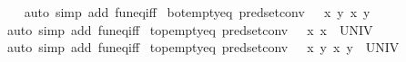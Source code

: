 \begin{isabellebody}
%
\isadelimproof
\ \ %
\endisadelimproof
%
\isatagproof
{}\isamarkupfalse%
\ {\isacharparenleft}{\kern0pt}auto\ simp\ add{\isacharcolon}{\kern0pt}\ fun{\isacharunderscore}{\kern0pt}eq{\isacharunderscore}{\kern0pt}iff{\isacharparenright}{\kern0pt}%
\endisatagproof
{\isafoldproof}%
%
\isadelimproof
\isanewline
%
\endisadelimproof
\isanewline
{}\isamarkupfalse%
\ bot{\isacharunderscore}{\kern0pt}empty{\isacharunderscore}{\kern0pt}eq{}\ {\isacharbrackleft}{\kern0pt}pred{\isacharunderscore}{\kern0pt}set{\isacharunderscore}{\kern0pt}conv{\isacharbrackright}{\kern0pt}{\isacharcolon}{\kern0pt}\ {\isachardoublequoteopen}{\isasymbottom}\ {\isacharequal}{\kern0pt}\ {\isacharparenleft}{\kern0pt}{\isasymlambda}x\ y{\isachardot}{\kern0pt}\ {\isacharparenleft}{\kern0pt}x{\isacharcomma}{\kern0pt}\ y{\isacharparenright}{\kern0pt}\ {\isasymin}\ {\isacharbraceleft}{\kern0pt}{\isacharbraceright}{\kern0pt}{\isacharparenright}{\kern0pt}{\isachardoublequoteclose}\isanewline
%
\isadelimproof
\ \ %
\endisadelimproof
%
\isatagproof
{}\isamarkupfalse%
\ {\isacharparenleft}{\kern0pt}auto\ simp\ add{\isacharcolon}{\kern0pt}\ fun{\isacharunderscore}{\kern0pt}eq{\isacharunderscore}{\kern0pt}iff{\isacharparenright}{\kern0pt}%
\endisatagproof
{\isafoldproof}%
%
\isadelimproof
\isanewline
%
\endisadelimproof
\isanewline
{}\isamarkupfalse%
\ top{\isacharunderscore}{\kern0pt}empty{\isacharunderscore}{\kern0pt}eq\ {\isacharbrackleft}{\kern0pt}pred{\isacharunderscore}{\kern0pt}set{\isacharunderscore}{\kern0pt}conv{\isacharbrackright}{\kern0pt}{\isacharcolon}{\kern0pt}\ {\isachardoublequoteopen}{\isasymtop}\ {\isacharequal}{\kern0pt}\ {\isacharparenleft}{\kern0pt}{\isasymlambda}x{\isachardot}{\kern0pt}\ x\ {\isasymin}\ UNIV{\isacharparenright}{\kern0pt}{\isachardoublequoteclose}\isanewline
%
\isadelimproof
\ \ %
\endisadelimproof
%
\isatagproof
{}\isamarkupfalse%
\ {\isacharparenleft}{\kern0pt}auto\ simp\ add{\isacharcolon}{\kern0pt}\ fun{\isacharunderscore}{\kern0pt}eq{\isacharunderscore}{\kern0pt}iff{\isacharparenright}{\kern0pt}%
\endisatagproof
{\isafoldproof}%
%
\isadelimproof
\isanewline
%
\endisadelimproof
\isanewline
{}\isamarkupfalse%
\ top{\isacharunderscore}{\kern0pt}empty{\isacharunderscore}{\kern0pt}eq{}\ {\isacharbrackleft}{\kern0pt}pred{\isacharunderscore}{\kern0pt}set{\isacharunderscore}{\kern0pt}conv{\isacharbrackright}{\kern0pt}{\isacharcolon}{\kern0pt}\ {\isachardoublequoteopen}{\isasymtop}\ {\isacharequal}{\kern0pt}\ {\isacharparenleft}{\kern0pt}{\isasymlambda}x\ y{\isachardot}{\kern0pt}\ {\isacharparenleft}{\kern0pt}x{\isacharcomma}{\kern0pt}\ y{\isacharparenright}{\kern0pt}\ {\isasymin}\ UNIV{\isacharparenright}{\kern0pt}{\isachardoublequoteclose}\isanewline

\end{isabellebody}

